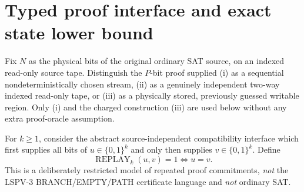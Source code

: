 \documentclass[11pt]{article}
\begin{document}
\section{Typed proof interface and exact state lower bound}
Fix $N$ as the physical bits of the original ordinary SAT source, on an indexed read-only source tape. Distinguish the $P$-bit proof supplied (i) as a sequential nondeterministically chosen stream, (ii) as a genuinely independent two-way indexed read-only tape, or (iii) as a physically stored, previously guessed writable region. Only (i) and the charged construction (iii) are used below without any extra proof-oracle assumption.

For $k\ge1$, consider the abstract source-independent compatibility interface which first supplies all bits of $u\in\{0,1\}^k$ and only then supplies $v\in\{0,1\}^k$. Define
\[
 \operatorname{REPLAY}_k(u,v)=1\iff u=v.\tag{1}
\]
This is a deliberately restricted model of repeated proof commitments, \emph{not} the LSPV-3 BRANCH/EMPTY/PATH certificate language and \emph{not} ordinary SAT.
\end{document}
